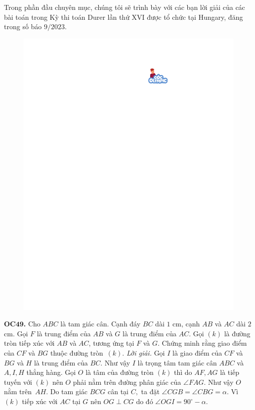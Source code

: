 \begin{multicols}{2}
	Trong phần đầu chuyên mục, chúng tôi sẽ trình bày với các bạn lời giải của các bài toán trong Kỳ thi toán Durer lần thứ XVI được tổ chức tại Hungary, đăng trong số báo $9/2023$. 
	\begin{figure}[H]
		\vspace*{-10pt}
		\centering
		\captionsetup{labelformat= empty, justification=centering}
		\includegraphics[width= 0.8\linewidth]{gocolympic}
		\vspace*{-10pt}
	\end{figure}
	{\bf\color{cackithi} OC$\pmb{49}$.} Cho $ABC$ là tam giác cân. Cạnh đáy $BC$ dài $1$ cm, cạnh $AB$ và $AC$ dài $2$ cm. Gọi $F$ là trung điểm của $AB$ và $G$ là trung điểm của $AC.$ Gọi $(k)$ là đường tròn tiếp xúc với $AB$ và $AC$, tương ứng tại $F$ và $G$. Chứng minh rằng giao điểm của $CF$ và $BG$ thuộc đường tròn~$(k).$
	\vskip 0.1cm
	\textit{Lời giải.} 
	Gọi $I$ là giao điểm của $CF$ và $BG$ và $H$ là trung điểm của $BC.$ Như vậy $I$ là trọng tâm tam giác cân $ABC$ và $A, I, H$ thẳng hàng. Gọi $O$ là tâm của đường tròn $(k)$ thì do $AF, AG$ là tiếp tuyến với $(k)$ nên $O$ phải nằm trên đường phân giác của $\angle FAG.$ Như vậy $O$ nằm trên~$AH.$
	\vskip 0.1cm
	Do tam giác $BCG$ cân tại $C,$ ta đặt $\angle CGB=\angle CBG=\alpha.$ Vì $(k)$ tiếp xúc với $AC$ tại $G$ nên $OG\perp CG$ do đó $\angle OGI= 90^\circ -\alpha.$

\end{multicols}
